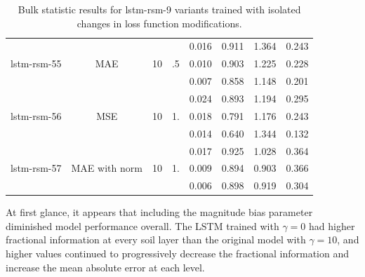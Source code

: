 \begin{table}[h!p]
\begin{tabular}{c|c|c|c|c|c|c|c }
\hline
\multirow{3}{6em}{lstm-rsm-55} & \multirow{3}{3em}{MAE} & \multirow{3}{3em}{10} &  \multirow{3}{3em}{.5} & 0.016 & 0.911 & 1.364 & 0.243 \\ & & & & 0.010 & 0.903 & 1.225 & 0.228 \\ & & & & 0.007 & 0.858 & 1.148 & 0.201 \\
\hline
\hline
\multirow{3}{6em}{lstm-rsm-56} & \multirow{3}{3em}{MSE} & \multirow{3}{3em}{10} &  \multirow{3}{3em}{1.} & 0.024 & 0.893 & 1.194 & 0.295 \\ & & & & 0.018 & 0.791 & 1.176 & 0.243 \\ & & & & 0.014 & 0.640 & 1.344 & 0.132 \\
\hline
\hline
\multirow{3}{6em}{lstm-rsm-57} & \multirow{3}{3em}{MAE with norm} & \multirow{3}{3em}{10} &  \multirow{3}{3em}{1.} & 0.017 & 0.925 & 1.028 & 0.364 \\ & & & & 0.009 & 0.894 & 0.903 & 0.366 \\ & & & & 0.006 & 0.898 & 0.919 & 0.304 \\
\end{tabular}
    \caption{Bulk statistic results for lstm-rsm-9 variants trained with isolated changes in loss function modifications.}
    \label{loss-variants-table}
\end{table}

At first glance, it appears that including the magnitude bias parameter diminished model performance overall. The LSTM trained with $\gamma=0$ had higher fractional information at every soil layer than the original model with $\gamma=10$, and higher values continued to progressively decrease the fractional information and increase the mean absolute error at each level.

